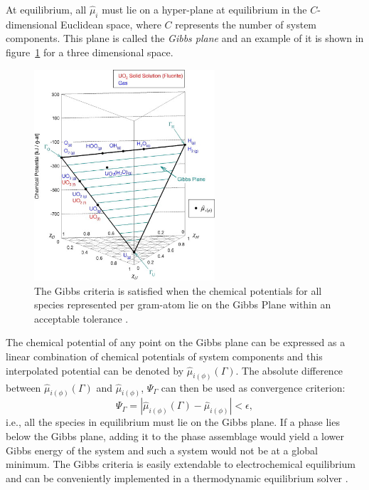 \begin{enumerate}
	 At equilibrium, all $\hat{\mu}_{i}$ must lie on a hyper-plane at equilibrium in the $C$-dimensional Euclidean space, where $C$ represents the number of system components. This plane is called the \emph{Gibbs plane} and an example of it is shown in figure~\ref{fig:GibbsPlane} for a three dimensional space.
	 \begin{figure}[h!]
		\centering
		\includegraphics[width=0.6\textwidth]{figures/Gibbs_plane.jpg}
		\caption[The Gibbs criteria is satisfied when the chemical potentials for all species represented per gram-atom lie on the Gibbs Plane within an acceptable tolerance.]{The Gibbs criteria is satisfied when the chemical potentials for all species represented per gram-atom lie on the Gibbs Plane within an acceptable tolerance \cite{Piro11a}.}
		\label{fig:GibbsPlane}
	\end{figure}

	The chemical potential of any point on the Gibbs plane can be expressed as a linear combination of  chemical potentials of system components and this interpolated potential can be denoted by $\hat{\mu}_{i(\phi)}(\Gamma)$. The absolute difference between $\hat{\mu}_{i(\phi)}(\Gamma)$ and $\hat{\mu}_{i(\phi)}$, $\Psi_{\Gamma}$ can then be used as convergence criterion:
		\begin{equation}\label{eqn:convGC}
			\Psi_{\Gamma} = \left \vert  \hat{\mu}_{i(\phi)}(\Gamma) - \hat{\mu}_{i(\phi)} \right \vert < \epsilon,
		\end{equation}
	 i.e., all the species in equilibrium must lie on the Gibbs plane. If a phase lies below the Gibbs plane, adding it to the phase assemblage would yield a lower Gibbs energy of the system and such a system would not be at a global minimum. The Gibbs criteria is easily extendable to electrochemical equilibrium and can be conveniently implemented in a thermodynamic equilibrium solver \cite{Piro11a}.
	 \end{enumerate}
	 

